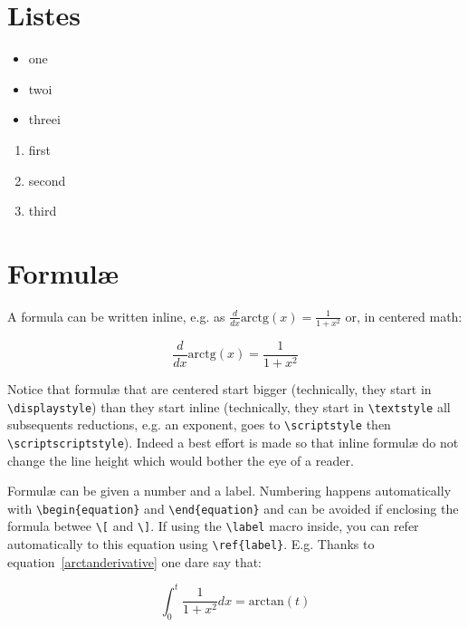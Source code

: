 \section{Listes}

\begin{itemize}
 \itemsep0pt
 \item one
 \item twoi
 \item threei
\end{itemize}

\begin{enumerate}
 \itemsep0pt
 \item first
 \item second
 \item third
\end{enumerate}


\section{Formulæ}

A formula can be written inline, e.g. as $ \frac{d}{dx}\mbox{arctg}(x) = \frac{1}{1+x^2}$ or, in centered math:

\begin{equation}  \frac{d}{dx}\mbox{arctg}(x) = \frac{1}{1+x^2} \label{arctanderivative}\end{equation}

Notice that formulæ that are centered start bigger (technically, they start in \verb+\displaystyle+) than they start inline (technically, they start in \verb+\textstyle+ all subsequents reductions, e.g. an exponent, goes to \verb+\scriptstyle+ then \verb+\scriptscriptstyle+). Indeed a best effort is made so that inline formulæ do not change the line height which would bother the eye of a reader.

Formulæ can be given a number and a label. Numbering happens automatically with \verb+\begin{equation}+ and \verb+\end{equation}+ and can be avoided if enclosing the formula betwee \verb+\[+ and \verb+\]+. If using the \verb+\label+ macro inside, you can refer automatically to this equation using \verb+\ref{label}+. E.g. Thanks to equation~\ref{arctanderivative} one dare say that:

\begin{equation} \int_0^t \frac{1}{1+x^2} dx = \mbox{arctan}(t) \end{equation}


